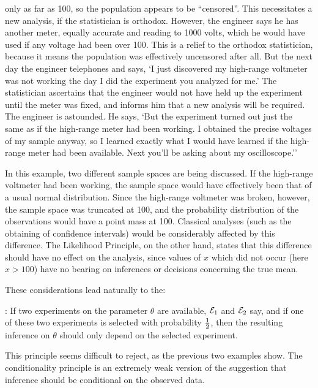 only as far as 100, so the population appears to be ``censored''.  This
necessitates a new analysis, if the statistician is orthodox.  However, the
engineer says he has another meter, equally accurate and reading to 1000
volts, which he would have used if any voltage had been over 100.  This is a
relief to the orthodox statistician, because it means the population was
effectively uncensored after all.  But the next day the engineer telephones
and says, `I just discovered my high-range voltmeter was not working the day
I did the experiment you analyzed for me.' The statistician ascertains that
the engineer would not have held up the experiment until the meter was
fixed, and informs him that a new analysis will be required.  The engineer
is astounded.  He says, `But the experiment turned out just the same as if
the high-range meter had been working.  I obtained the precise voltages of
my sample anyway, so I learned exactly what I would have learned if the
high-range meter had been available.  Next you'll be asking about my
oscilloscope.''

In this example, two different sample spaces are being discussed.  If the
high-range voltmeter had been working, the sample space would have
effectively been that of a usual normal distribution.  Since the high-range
voltmeter was broken, however, the sample space was truncated at 100, and
the probability distribution of the observations would have a point mass at
100.  Classical analyses (such as the obtaining of confidence intervals)
would be considerably affected by this difference.  The Likelihood
Principle, on the other hand, states that this difference should have no
effect on the analysis, since values of $x$ which did not occur (here $x>100$)
have no bearing on inferences or decisions concerning the true mean. 


\vskip 4mm
These considerations lead naturally to the:

\bigskip

:  If two experiments on the parameter $\theta$ are
available, ${\cal{E}}_1$ and ${\cal{E}}_2$ say, and if one of these two
experiments is selected with probability ${1\over 2}$, then the
resulting inference on $\theta$ should only depend on the selected
experiment.  

\bigskip

This principle seems difficult to reject, as the previous
two examples show. 
\vskip 4mm
The conditionality principle is an extremely weak version of the
suggestion that inference should be conditional on the observed data.

